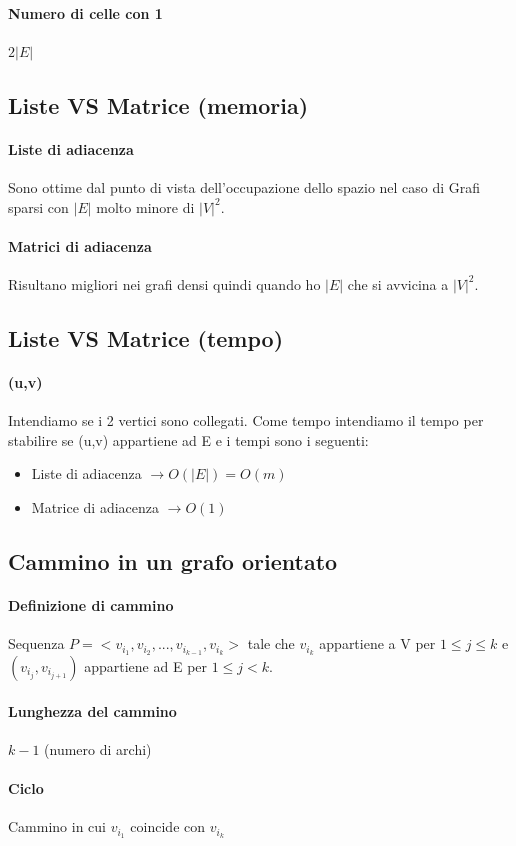 \paragraph*{Numero di celle con 1} $2|E|$
\subsection{Liste VS Matrice (memoria)}
\paragraph*{Liste di adiacenza} Sono ottime dal punto di vista dell'occupazione dello spazio 
nel caso di Grafi sparsi con $|E|$ molto minore di $|V|^2$.
\paragraph*{Matrici di adiacenza} Risultano migliori nei grafi densi quindi quando ho
$|E|$ che si avvicina a $|V|^2$.
\subsection{Liste VS Matrice (tempo)}
\paragraph*{(u,v)} Intendiamo se i 2 vertici sono collegati.
Come tempo intendiamo il tempo per stabilire se (u,v) appartiene ad E e i tempi
sono i seguenti:
\begin{itemize}
    \item Liste di adiacenza $\rightarrow O(|E|) = O(m)$
    \item Matrice di adiacenza $\rightarrow O(1)$
\end{itemize}
\subsection{Cammino in un grafo orientato}
\paragraph*{Definizione di cammino} Sequenza $P=<v_{i_1},v_{i_2},..., v_{i_{k-1}},v_{i_k}>$
tale che $v_{i_k}$ appartiene a V per $1\leq j \leq k$ e $(v_{i_j},v_{i_{j+1}})$ appartiene
ad E per $1 \leq j < k$.
\paragraph*{Lunghezza del cammino} $k-1$ (numero di archi)
\paragraph*{Ciclo} Cammino in cui $v_{i_1}$ coincide con $v_{i_k}$
